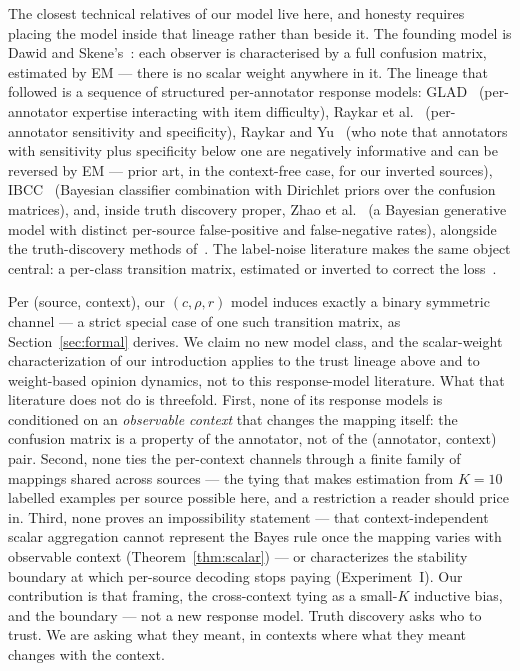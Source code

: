 The closest technical relatives of our model live here, and honesty
requires placing the model inside that lineage rather than beside it.
The founding model is Dawid and Skene's~\cite{dawid1979}: each observer
is characterised by a full confusion matrix, estimated by EM --- there
is no scalar weight anywhere in it. The lineage that followed is a
sequence of structured per-annotator response models: GLAD~\cite{whitehill2009glad}
(per-annotator expertise interacting with item difficulty), Raykar
et al.~\cite{raykar2010} (per-annotator sensitivity and specificity),
Raykar and Yu~\cite{raykar2012} (who note that annotators with
sensitivity plus specificity below one are negatively informative and
can be reversed by EM --- prior art, in the context-free case, for our
inverted sources), IBCC~\cite{kim2012ibcc} (Bayesian classifier
combination with Dirichlet priors over the confusion matrices), and,
inside truth discovery proper, Zhao et al.~\cite{zhao2012bayesian} (a
Bayesian generative model with distinct per-source false-positive and
false-negative rates), alongside the truth-discovery methods
of~\cite{dong2009,yin2008,pasternack2011}. The label-noise literature
makes the same object central: a per-class transition matrix, estimated
or inverted to correct the loss~\cite{natarajan2013,patrini2017}.

Per (source, context), our $(c,\rho,r)$ model induces exactly a binary
symmetric channel --- a strict special case of one such transition
matrix, as Section~\ref{sec:formal} derives. We claim no new model
class, and the scalar-weight characterization of our introduction
applies to the trust lineage above and to weight-based opinion
dynamics, not to this response-model literature. What that literature
does not do is threefold. First, none of its response models is
conditioned on an \emph{observable context} that changes the mapping
itself: the confusion matrix is a property of the annotator, not of the
(annotator, context) pair. Second, none ties the per-context channels
through a finite family of mappings shared across sources --- the tying
that makes estimation from $K=10$ labelled examples per source possible
here, and a restriction a reader should price in. Third, none proves an
impossibility statement --- that context-independent scalar aggregation
cannot represent the Bayes rule once the mapping varies with observable
context (Theorem~\ref{thm:scalar}) --- or characterizes the stability
boundary at which per-source decoding stops paying (Experiment~I). Our
contribution is that framing, the cross-context tying as a small-$K$
inductive bias, and the boundary --- not a new response model. Truth
discovery asks who to trust. We are asking what they meant, in contexts
where what they meant changes with the context.

